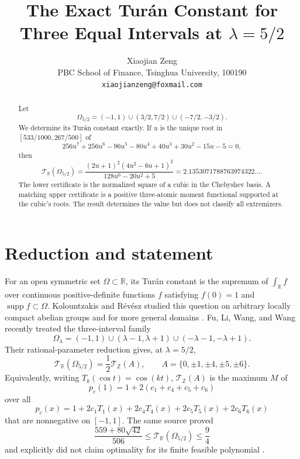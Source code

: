 \documentclass[11pt]{article}
\title{The Exact Tur\'an Constant for Three Equal Intervals at
  $\lambda=5/2$}
\author{Xiaojian Zeng\\
PBC School of Finance, Tsinghua University, 100190\\
\texttt{xiaojianzeng@foxmail.com}}
\date{}
\newcommand{\TR}{\mathcal T_{\mathbb R}}
\newcommand{\TZ}{\mathcal T_{\mathbb Z}}
\begin{document}
\maketitle

\begin{abstract}
Let
\[
 \Omega_{5/2}=(-1,1)\cup(3/2,7/2)\cup(-7/2,-3/2).
\]
We determine its Tur\'an constant exactly.  If $u$ is the unique root in
$[533/1000,267/500]$ of
\[
256u^7+256u^6-96u^5-80u^4+40u^3+30u^2-15u-5=0,
\]
then
\[
 \mathcal T_{\mathbb R}(\Omega_{5/2})
 =\frac{(2u+1)^2(4u^2-6u+1)^2}{128u^6-20u^2+5}
 =2.1353071788763974322\ldots .
\]
The lower certificate is the normalized square of a cubic in the Chebyshev
basis.  A matching upper certificate is a positive three-atomic moment
functional supported at the cubic's roots.  The result determines the value
but does not classify all extremizers.
\end{abstract}

\section{Reduction and statement}

For an open symmetric set $\Omega\subset\mathbb R$, its Tur\'an constant is
the supremum of $\int_{\mathbb R}f$ over continuous positive-definite
functions $f$ satisfying $f(0)=1$ and $\operatorname{supp}f\subset\Omega$.
Kolountzakis and R\'ev\'esz studied this question on arbitrary locally compact
abelian groups and for more general domains
\cite{KolountzakisRevesz2006}.  Fu, Li, Wang, and Wang recently treated the
three-interval family
\[
 \Omega_\lambda=(-1,1)\cup(\lambda-1,\lambda+1)
 \cup(-\lambda-1,-\lambda+1).
\]
Their rational-parameter reduction \cite[Theorem~1.2]{FuLiWangWang2026}
gives, at $\lambda=5/2$,
\begin{equation}\label{eq:reduction}
 \TR(\Omega_{5/2})=\frac12\TZ(A),
 \qquad A=\{0,\pm1,\pm4,\pm5,\pm6\}.
\end{equation}
Equivalently, writing $T_k(\cos t)=\cos(kt)$, $\TZ(A)$ is the maximum
$M$ of
\begin{equation}\label{eq:finite}
 p_c(1)=1+2(c_1+c_4+c_5+c_6)
\end{equation}
over all
\[
 p_c(x)=1+2c_1T_1(x)+2c_4T_4(x)+2c_5T_5(x)+2c_6T_6(x)
\]
that are nonnegative on $[-1,1]$.  The same source proved
\[
 \frac{559+80\sqrt{42}}{506}
 \leq \TR(\Omega_{5/2})\leq\frac94
\]
and explicitly did not claim optimality for its finite feasible polynomial
\cite[Proposition~4.2 and Lemma~5.1]{FuLiWangWang2026}.
\end{document}
